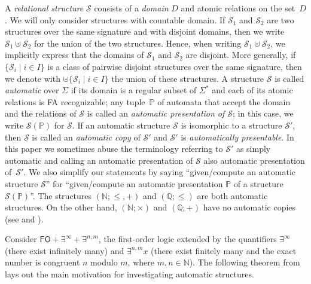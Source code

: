\documentclass[envcountsame]{llncs}
\newcommand{\FO}{\mathsf{FO}}
\newcommand{\N}{\mathbb N}
\renewcommand{\P}{{\mathbb P}}
\newcommand{\Q}{\mathbb Q}
\renewcommand{\S}{\mathcal S}
\begin{document}
A {\em relational structure} $\S$ consists of a {\em domain} $D$ and
atomic relations on the set~$D$. We will only consider structures with
countable domain. If $\S_1$ and $\S_2$ are two structures over the
same signature and with disjoint domains, then we write $\S_1 \uplus
\S_2$ for the union of the two structures. Hence, when writing $\S_1
\uplus \S_2$, we implicitly express that the domains of $\S_1$ and
$\S_2$ are disjoint. More generally, if $\{ \S_i \mid i \in I \}$ is a
class of pairwise disjoint structures over the same signature, then we
denote with $\uplus\{ \S_i \mid i \in I \}$ the union of these
structures. A structure $\S$ is called {\em automatic} over $\Sigma$
if its domain is a regular subset of $\Sigma^*$ and each of its atomic
relations is FA recognizable; any tuple~$\P$ of automata that accept
the domain and the relations of $\S$ is called an \emph{automatic
  presentation of $\S$}; in this case, we write $\S(\P)$ for $\S$. If
an automatic structure $\S$ is isomorphic to a structure $\S'$, then
$\S$ is called an {\em automatic copy} of $\S'$ and $\S'$ is {\em
  automatically presentable}. In this paper we sometimes abuse the
terminology referring to $\S'$ as simply automatic and calling an
automatic presentation of $\S$ also automatic presentation
of~$\S'$. We also simplify our statements by saying ``given/compute an
automatic structure $\S$'' for ``given/compute an automatic
presentation $\P$ of a structure $\S(\P)$''. The structures $(\N; \leq,
+)$ and $(\Q; \leq)$ are both automatic structures. On the other hand,
$(\N; \times)$ and $(\Q; +)$ have no automatic copies (see
\cite{KhMi08,Rub08} and \cite{Tsankov}).

Consider $\FO+\exists^\infty+\exists^{n,m}$, the first-order
logic extended by the quantifiers $\exists^{\infty}$ (there exist infinitely
many) and $\exists^{n,m} x$ (there exist finitely many and the exact number
is congruent $n$ modulo $m$, where $m,n\in \N$). The
following theorem from \cite{BluGrae00,Hod82,KhoN95,Rub04}
lays out the main motivation for investigating automatic structures.
\end{document}
